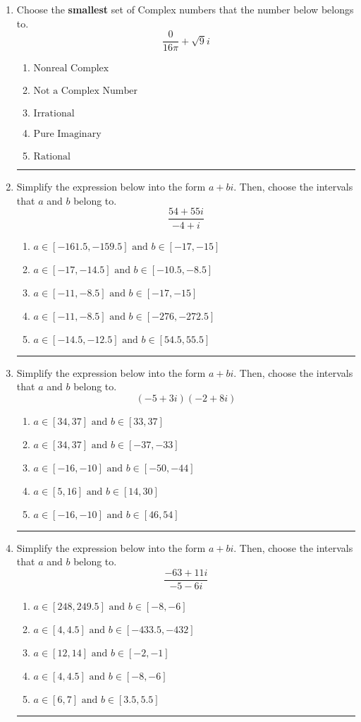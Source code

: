 \documentclass[14pt]{extbook}
\newcommand{\litem}[1]{\item#1\hspace*{-1cm}\rule{\textwidth}{0.4pt}}
\begin{document}
\begin{enumerate}
\litem{
Choose the \textbf{smallest} set of Complex numbers that the number below belongs to.\[ \frac{0}{16 \pi}+\sqrt{9}i \]\begin{enumerate}[label=\Alph*.]
\item \( \text{Nonreal Complex} \)
\item \( \text{Not a Complex Number} \)
\item \( \text{Irrational} \)
\item \( \text{Pure Imaginary} \)
\item \( \text{Rational} \)

\end{enumerate} }
\litem{
Simplify the expression below into the form $a+bi$. Then, choose the intervals that $a$ and $b$ belong to.\[ \frac{54 + 55 i}{-4 + i} \]\begin{enumerate}[label=\Alph*.]
\item \( a \in [-161.5, -159.5] \text{ and } b \in [-17, -15] \)
\item \( a \in [-17, -14.5] \text{ and } b \in [-10.5, -8.5] \)
\item \( a \in [-11, -8.5] \text{ and } b \in [-17, -15] \)
\item \( a \in [-11, -8.5] \text{ and } b \in [-276, -272.5] \)
\item \( a \in [-14.5, -12.5] \text{ and } b \in [54.5, 55.5] \)

\end{enumerate} }
\litem{
Simplify the expression below into the form $a+bi$. Then, choose the intervals that $a$ and $b$ belong to.\[ (-5 + 3 i)(-2 + 8 i) \]\begin{enumerate}[label=\Alph*.]
\item \( a \in [34, 37] \text{ and } b \in [33, 37] \)
\item \( a \in [34, 37] \text{ and } b \in [-37, -33] \)
\item \( a \in [-16, -10] \text{ and } b \in [-50, -44] \)
\item \( a \in [5, 16] \text{ and } b \in [14, 30] \)
\item \( a \in [-16, -10] \text{ and } b \in [46, 54] \)

\end{enumerate} }
\litem{
Simplify the expression below into the form $a+bi$. Then, choose the intervals that $a$ and $b$ belong to.\[ \frac{-63 + 11 i}{-5 - 6 i} \]\begin{enumerate}[label=\Alph*.]
\item \( a \in [248, 249.5] \text{ and } b \in [-8, -6] \)
\item \( a \in [4, 4.5] \text{ and } b \in [-433.5, -432] \)
\item \( a \in [12, 14] \text{ and } b \in [-2, -1] \)
\item \( a \in [4, 4.5] \text{ and } b \in [-8, -6] \)
\item \( a \in [6, 7] \text{ and } b \in [3.5, 5.5] \)


\end{enumerate}}
\end{enumerate}
\end{document}
